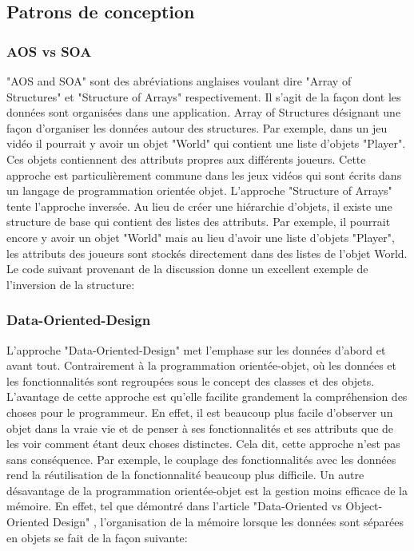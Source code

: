 \documentclass[12pt]{article}
\begin{document}
\subsection{Patrons de conception}

\subsubsection{AOS vs SOA}

"AOS and SOA" sont des abréviations anglaises voulant dire "Array of Structures" et "Structure of Arrays" respectivement. Il s'agit de la façon dont les données sont organisées dans une application. Array of Structures désignant une façon d'organiser les données autour des structures. Par exemple, dans un jeu vidéo il pourrait y avoir un objet "World" qui contient une liste d'objets "Player". Ces objets contiennent des attributs propres aux différents joueurs. Cette approche est particulièrement commune dans les jeux vidéos qui sont écrits dans un langage de programmation orientée objet. L'approche "Structure of Arrays" tente l'approche inversée. Au lieu de créer une hiérarchie d'objets, il existe une structure de base qui contient des listes des attributs. Par exemple, il pourrait encore y avoir un objet "World" mais au lieu d'avoir une liste d'objets "Player", les attributs des joueurs sont stockés directement dans des listes de l'objet World. Le code suivant provenant de la discussion \cite{SOA_AOS_HN} donne un excellent exemple de l'inversion de la structure:



\subsubsection{Data-Oriented-Design}

L'approche "Data-Oriented-Design" met l'emphase sur les données d'abord et avant tout. Contrairement à la programmation orientée-objet, où les données et les fonctionnalités sont regroupées sous le concept des classes et des objets. L'avantage de cette approche est qu'elle facilite grandement la compréhension des choses pour le programmeur. En effet, il est beaucoup plus facile d'observer un objet dans la vraie vie et de penser à ses fonctionnalités et ses attributs que de les voir comment étant deux choses distinctes. Cela dit, cette approche n'est pas sans conséquence. Par exemple, le couplage des fonctionnalités avec les données rend la réutilisation de la fonctionnalité beaucoup plus difficile.  Un autre désavantage de la programmation orientée-objet est la gestion moins efficace de la mémoire. En effet, tel que démontré dans l'article "Data-Oriented vs Object-Oriented Design" \cite{data_oriented_design}, l'organisation de la mémoire lorsque les données sont séparées en objets se fait de la façon suivante:
\end{document}
